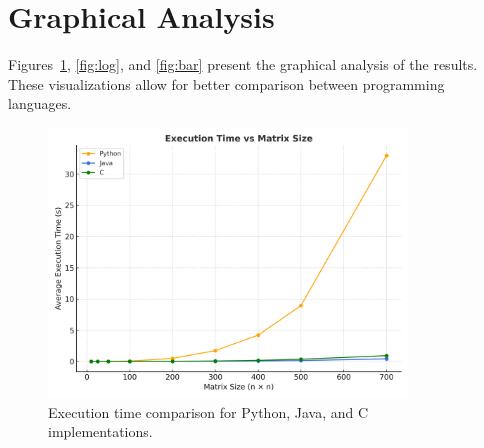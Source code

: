 \documentclass[a4paper,12pt]{article}
\begin{document}
\section*{Graphical Analysis}

Figures~\ref{fig:linear}, \ref{fig:log}, and \ref{fig:bar} present the graphical analysis of the results. These visualizations allow for better comparison between programming languages.

\begin{figure}[H]
    \centering
    \includegraphics[width=0.85\textwidth]{execution_time_linear.png}
    \caption{Execution time comparison for Python, Java, and C implementations.}
    \label{fig:linear}
\end{figure}
\end{document}
